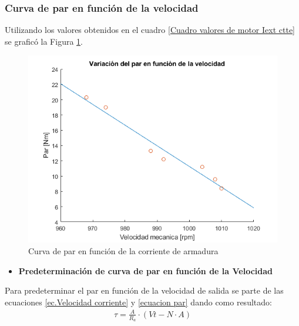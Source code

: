 \documentclass[11pt,letterpaper]{article}     %
\begin{document}
\subsubsection{Curva de par en función de la velocidad}
Utilizando los valores obtenidos en el cuadro \ref{Cuadro valores de motor Iext ctte} se graficó la Figura \ref{fig:CurvaDeParVelocidad}.
	\begin{figure}[H]
	\centering
	\includegraphics[scale=0.8]{./recursos-Lab6/curvaParVelocidad.png}
	\caption{Curva de par en función de la corriente de armadura}
	\label{fig:CurvaDeParVelocidad}
\end{figure}
	\begin{itemize}
	\item \textbf{Predeterminación de curva de par en función de la Velocidad}
\end{itemize}
Para predeterminar el par en función de la velocidad de salida se parte de las ecuaciones \ref{ec.Velocidad corriente} y \ref{ecuacion par} dando como resultado:
\begin{eqnarray}
\tau = \frac{A}{R_a}\cdot (Vt- N \cdot A)
\end{eqnarray}
\end{document}
